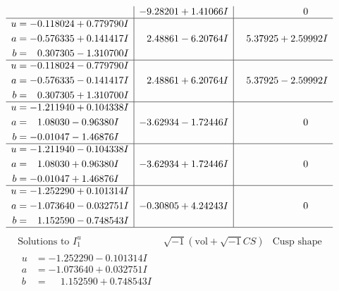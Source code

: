 \documentclass[1p]{elsarticle_modified}
\theoremstyle{definition}
\newcommand{\I}{\sqrt{-1}}
\begin{document}
$$\begin{array}{c|c|c}
 & -9.28201 + 1.41066 I & \phantom{-0.000000 } 0 \\ \hline\begin{aligned}
u &= -0.118024 + 0.779790 I \\
a &= -0.576335 + 0.141417 I \\
b &= \phantom{-}0.307305 - 1.310700 I\end{aligned}
 & \phantom{-}2.48861 - 6.20764 I & \phantom{-}5.37925 + 2.59992 I \\ \hline\begin{aligned}
u &= -0.118024 - 0.779790 I \\
a &= -0.576335 - 0.141417 I \\
b &= \phantom{-}0.307305 + 1.310700 I\end{aligned}
 & \phantom{-}2.48861 + 6.20764 I & \phantom{-}5.37925 - 2.59992 I \\ \hline\begin{aligned}
u &= -1.211940 + 0.104338 I \\
a &= \phantom{-}1.08030 - 0.96380 I \\
b &= -0.01047 - 1.46876 I\end{aligned}
 & -3.62934 - 1.72446 I & \phantom{-0.000000 } 0 \\ \hline\begin{aligned}
u &= -1.211940 - 0.104338 I \\
a &= \phantom{-}1.08030 + 0.96380 I \\
b &= -0.01047 + 1.46876 I\end{aligned}
 & -3.62934 + 1.72446 I & \phantom{-0.000000 } 0 \\ \hline\begin{aligned}
u &= -1.252290 + 0.101314 I \\
a &= -1.073640 - 0.032751 I \\
b &= \phantom{-}1.152590 - 0.748543 I\end{aligned}
 & -0.30805 + 4.24243 I & \phantom{-0.000000 } 0\\
 \hline 
 \end{array}$$\newpage$$\begin{array}{c|c|c}  
\text{Solutions to }I^u_{1}& \I (\text{vol} + \sqrt{-1}CS) & \text{Cusp shape}\\
 \hline 
\begin{aligned}
u &= -1.252290 - 0.101314 I \\
a &= -1.073640 + 0.032751 I \\
b &= \phantom{-}1.152590 + 0.748543 I\end{aligned}

\end{array}$$
\end{document}
